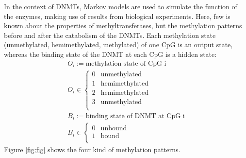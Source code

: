 In the context of \acp{DNMT}, Markov models are used to simulate the function of the enzymes, making use of results from biological experiments. Here, few is known about the properties of methyltransferases, but the methylation patterns before and after the catabolism of the \acp{DNMT}. Each methylation state (unmethylated, hemimethylated, methylated) of one \ac{CpG} is an output state, whereas the binding state of the \ac{DNMT} at each \ac{CpG} is a hidden state:\newline
\begin{align}
O_i := \text{methylation state of CpG i}\\
O_i \in \left\{
\begin{array}{ll}
0 & \text{unmethylated} \\
1 & \text{hemimethylated} \\
2 & \text{hemimethylated} \\
3 & \text{unmethylated} \\
\end{array}
\right.\\
B_i := \text{binding state of DNMT at CpG i}\\
B_i \in \left\{
\begin{array}{ll}
0 & \text{unbound} \\
1 & \text{bound} \\
\end{array}
\right.
\end{align}
Figure \ref{fig:fig} shows the four kind of methylation patterns.
